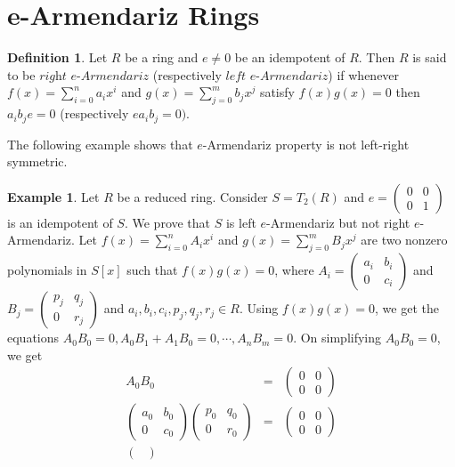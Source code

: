 \documentclass[12pt]{amsart}
\theoremstyle{plain}
\theoremstyle{definition}
\newtheorem{definition}{Definition}[section]
\newtheorem{example}{Example}[section]
\theoremstyle{remark}
\numberwithin{equation}{section}
\begin{document}
	\section{\textbf{e-Armendariz Rings}}
	\begin{definition}
		Let $R$ be a ring and $e\ne 0$ be an idempotent of $R$. Then $R$ is said to be $\textit{right e-Armendariz}$ (respectively $\textit{left e-Armendariz}$) if whenever $f(x)=\displaystyle\sum_{i=0}^{n}a_ix^i$ and $g(x)=\displaystyle\sum_{j=0}^{m}b_jx^j$ satisfy $f(x)g(x)=0$ then $a_ib_je=0$ (respectively $ea_ib_j=0).$
		\end{definition}
The following example shows that $e$-Armendariz property is not left-right symmetric.
\begin{example}
	Let $R$ be a reduced ring. Consider $S=T_2(R)$ and $e=\begin{pmatrix}
		0&0\\0&1
	\end{pmatrix}$ is an idempotent of $S$. We prove that $S$ is left $e$-Armendariz but not right $e$-Armendariz. Let $f(x)=\sum_{i=0}^nA_ix^i$ and $g(x)=\sum_{j=0}^mB_jx^j$ are two nonzero polynomials in $S[x]$ such that $f(x)g(x)=0$, where $A_i=\begin{pmatrix}
	a_i&b_i\\0&c_i
	\end{pmatrix}$ and $B_j=\begin{pmatrix}
	p_j&q_j\\0&r_j
	\end{pmatrix}$ and $a_i,b_i,c_i,p_j,q_j,r_j\in R.$ Using $f(x)g(x)=0$, we get the equations $A_0B_0=0, A_0B_1+A_1B_0=0,\cdots,A_nB_m=0.$ On simplifying $A_0B_0=0$, we get\begin{eqnarray*}
	A_0B_0 &=&
	\begin{pmatrix}
		0 & 0 \\ 0 & 0
	\end{pmatrix}\\
	\begin{pmatrix}
		a_0 & b_0 \\ 0 & c_0
	\end{pmatrix}
	\begin{pmatrix}
		p_0 & q_0 \\ 0 & r_0
	\end{pmatrix}&=&\begin{pmatrix}
	0 & 0 \\ 0 & 0
	\end{pmatrix} \\
	\begin{pmatrix}

\end{pmatrix}
\end{eqnarray*}
\end{example}
\end{document}
